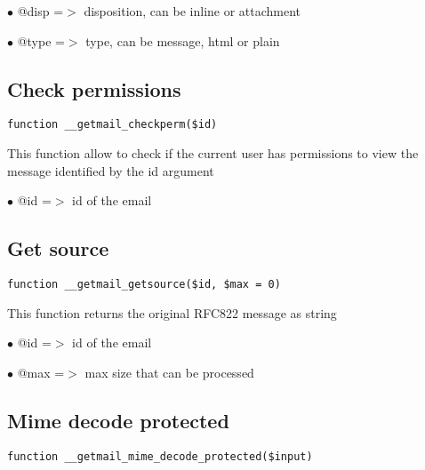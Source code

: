 \documentclass[a4paper]{book}
\begin{document}
\begin{compactitem}
\item[\color{myblue}$\bullet$] @disp =$>$ disposition, can be inline or attachment
\item[\color{myblue}$\bullet$] @type =$>$ type, can be message, html or plain
\end{compactitem}

\hypertarget{toc36}{}
\subsection{Check permissions}

\begin{lstlisting}
function __getmail_checkperm($id)
\end{lstlisting}

This function allow to check if the current user has permissions to view the
message identified by the id argument

\begin{compactitem}
\item[\color{myblue}$\bullet$] @id =$>$ id of the email
\end{compactitem}

\hypertarget{toc37}{}
\subsection{Get source}

\begin{lstlisting}
function __getmail_getsource($id, $max = 0)
\end{lstlisting}

This function returns the original RFC822 message as string

\begin{compactitem}
\item[\color{myblue}$\bullet$] @id  =$>$ id of the email
\item[\color{myblue}$\bullet$] @max =$>$ max size that can be processed
\end{compactitem}

\hypertarget{toc38}{}
\subsection{Mime decode protected}

\begin{lstlisting}
function __getmail_mime_decode_protected($input)
\end{lstlisting}
\end{document}
